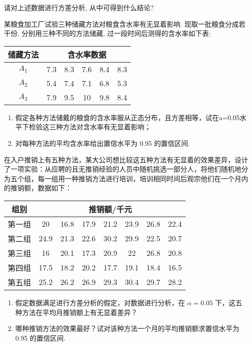 \begin{xiti}
  请对上述数据进行方差分析, 从中可得到什么结论?
  \item 某粮食加工厂试验三种储藏方法对粮食含水率有无显着影响. 现取一批粮食分成若干份, 分别用三种不同的方法储藏, 过一段时间后测得的含水率如下表:
  \begin{center}
    \begin{tabular}{cccccc}
      \toprule
      储藏方法  & \multicolumn{5}{c}{含水率数据} \\
      \midrule
      $A_1$    & 7.3   & 8.3   & 7.6   & 8.4   & 8.3 \\
      $A_2$    & 5.4   & 7.4   & 7.1   & 6.8   & 5.3 \\
      $A_3$    & 7.9   & 9.5   & 10    & 9.8   & 8.4 \\
      \bottomrule
    \end{tabular}%
  \end{center}
  \begin{enumerate}
    \item 假定各种方法储戴的粮食的含水率服从正态分布，且方差相等，试在a=0.05水平下检验这三种方法对含水率有无显着影响；
    \item 对每种方法的平均含水率给出置信水平为 0.95 的置信区间.
  \end{enumerate}
  \item 在入户推销上有五种方法，某大公司想比较这五种方法有无显着的效果差异，设计了一项实验：从应聘的且无推销经验的人员中随机挑选一部分人，将他们随机地分为五个组，每一组用一种推销方法进行培训，培训相同时间后观宗他们在一个月内的推销额，数据如下：
  \begin{center}
    \begin{tabular}{cccccccc}
      \toprule
      组别    & \multicolumn{7}{c}{推销额/千元} \\
      \midrule
      第一组   & 20    & 16.8  & 17.9  & 21.2  & 23.9  & 26.8  & 22.4 \\
      第二组   & 24.9  & 21.3  & 22.6  & 30.2  & 29.9  & 22.5  & 20.7 \\
      第三组   & 16    & 20.1  & 17.3  & 20.9  & 22    & 26.8  & 20.8 \\
      第四组   & 17.5  & 18.2  & 20.2  & 17.7  & 19.1  & 18.4  & 16.5 \\
      第五组   & 25.2  & 26.2  & 26.9  & 29.3  & 30.4  & 29.7  & 28.2 \\
      \bottomrule
    \end{tabular}%
  \end{center}
  \begin{enumerate}
    \item 假定数据满足进行方差分析的假定，对数据进行分析，在 $\alpha = 0.05$ 下，这五种方法在平均月推销额上有无显着差异？
    \item 哪种推销方法的效果最好？试对该种方法一个月的平均推销额求置信水平为 0.95 的置信区间.
  \end{enumerate}
\end{xiti}

